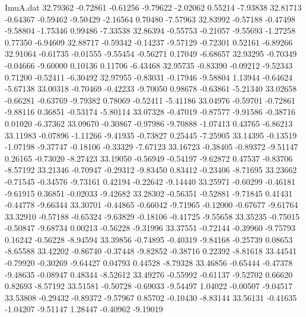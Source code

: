 \begin{filecontents}{ImuA.dat}
  32.79362   -0.72861   -0.61256   -9.79622   -2.02062    0.55214   -7.93838
  32.81713   -0.64367   -0.59462   -9.50429   -2.16564    0.70480   -7.57963
  32.83992   -0.57188   -0.47498   -9.58804   -1.75346    0.99486   -7.33538
  32.86394   -0.55753   -0.21057   -9.55693   -1.27258    0.77350   -6.94609
  32.88717   -0.59342   -0.14237   -9.57129   -0.72301    0.52161   -6.89266
  32.91064   -0.61735   -0.01555   -9.55454   -0.56271    0.17049   -6.68657
  32.93295   -0.70349   -0.04666   -9.60000    0.10136    0.11706   -6.43468
  32.95735   -0.83390   -0.09212   -9.52343    0.71200   -0.52411   -6.30492
  32.97955   -0.83031   -0.17946   -9.58804    1.13944   -0.64624   -5.67138
  33.00318   -0.70469   -0.42233   -9.70050    0.98678   -0.63861   -5.21340
  33.02658   -0.66281   -0.63769   -9.79382    0.78069   -0.52411   -5.41186
  33.04976   -0.59701   -0.72861   -9.88116    0.36851   -0.53174   -5.80114
  33.07328   -0.47019   -0.87577   -9.91586   -0.38716    0.01020   -6.37362
  33.09670   -0.30867   -0.97986   -9.70888   -1.07413    0.43765   -6.86213
  33.11983   -0.07896   -1.11266   -9.41935   -0.73827    0.25445   -7.25905
  33.14395   -0.13519   -1.07198   -9.37747   -0.18106   -0.33329   -7.67123
  33.16723   -0.38405   -0.89372   -9.51147    0.26165   -0.73020   -8.27423
  33.19050   -0.56949   -0.54197   -9.62872    0.47537   -0.83706   -8.57192
  33.21346   -0.70947   -0.29312   -9.83450    0.83412   -0.23406   -8.71695
  33.23662   -0.71545   -0.34576   -9.73161    0.42194   -0.22642   -9.14440
  33.25971   -0.60299   -0.46181   -9.61915    0.36851   -0.02033   -9.42682
  33.28302   -0.56351   -0.52881   -9.71845    0.41431   -0.44778   -9.66344
  33.30701   -0.44865   -0.66042   -9.71965   -0.12000   -0.67677   -9.61764
  33.32910   -0.57188   -0.65324   -9.63829   -0.18106   -0.41725   -9.55658
  33.35235   -0.75015   -0.50847   -9.68734    0.00213   -0.56228   -9.31996
  33.37551   -0.72144   -0.39960   -9.75793    0.16242   -0.56228   -8.94594
  33.39856   -0.74895   -0.40319   -9.84168   -0.25739    0.08653   -8.65588
  33.42202   -0.86740   -0.37448   -9.82852   -0.38716    0.22392   -8.81618
  33.44541   -0.79920   -0.30269   -9.64427    0.04793    0.44528   -8.79328
  33.46856   -0.65444   -0.47378   -9.48635   -0.08947    0.48344   -8.52612
  33.49276   -0.55992   -0.61137   -9.52702    0.66620    0.82693   -8.57192
  33.51581   -0.50728   -0.69033   -9.54497    1.04022   -0.00507   -9.04517
  33.53808   -0.29432   -0.89372   -9.57967    0.85702   -0.10430   -8.83144
  33.56131   -0.41635   -1.04207   -9.51147    1.28447   -0.40962   -9.19019

\end{filecontents}
